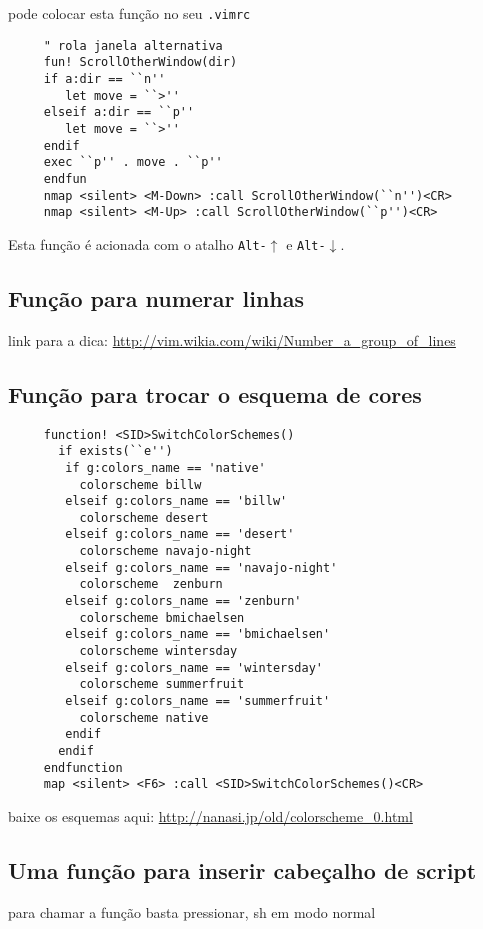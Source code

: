 pode colocar esta função no seu \verb|.vimrc|

\begin{verbatim}
     " rola janela alternativa
     fun! ScrollOtherWindow(dir)
     if a:dir == ``n''
        let move = ``>''
     elseif a:dir == ``p''
        let move = ``>''
     endif
     exec ``p'' . move . ``p''
     endfun
     nmap <silent> <M-Down> :call ScrollOtherWindow(``n'')<CR>
     nmap <silent> <M-Up> :call ScrollOtherWindow(``p'')<CR>
\end{verbatim}

Esta função é acionada com o atalho {\tt Alt-$\uparrow$} e {\tt Alt-$\downarrow$}.

\subsection{Função para numerar linhas}\label{Função para numerar linhas}
link para a dica: \url{http://vim.wikia.com/wiki/Number_a_group_of_lines}

\subsection{Função para trocar o esquema de cores}

\begin{verbatim}
     function! <SID>SwitchColorSchemes()
       if exists(``e'')
        if g:colors_name == 'native'
          colorscheme billw
        elseif g:colors_name == 'billw'
          colorscheme desert
        elseif g:colors_name == 'desert'
          colorscheme navajo-night
        elseif g:colors_name == 'navajo-night'
          colorscheme  zenburn
        elseif g:colors_name == 'zenburn'
          colorscheme bmichaelsen
        elseif g:colors_name == 'bmichaelsen'
          colorscheme wintersday
        elseif g:colors_name == 'wintersday'
          colorscheme summerfruit
        elseif g:colors_name == 'summerfruit'
          colorscheme native
        endif
       endif
     endfunction
     map <silent> <F6> :call <SID>SwitchColorSchemes()<CR>
\end{verbatim}

baixe os esquemas aqui:
\url{http://nanasi.jp/old/colorscheme_0.html}

\subsection{Uma função para inserir cabeçalho de script}
\label{Uma função para inserir cabeçalho de script bash}
para chamar a função
basta pressionar, sh em modo normal

